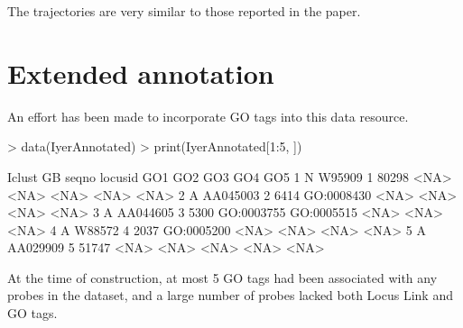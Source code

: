 \documentclass[12pt]{article}
\begin{document}
The trajectories are very similar to those reported in the paper.
\section{Extended annotation}
An effort has been made to incorporate GO tags into this data resource.
\begin{Schunk}
\begin{Sinput}
> data(IyerAnnotated)
> print(IyerAnnotated[1:5, ])
\end{Sinput}
\begin{Soutput}
  Iclust       GB seqno locusid        GO1        GO2  GO3  GO4  GO5
1      N   W95909     1   80298       <NA>       <NA> <NA> <NA> <NA>
2      A AA045003     2    6414 GO:0008430       <NA> <NA> <NA> <NA>
3      A AA044605     3    5300 GO:0003755 GO:0005515 <NA> <NA> <NA>
4      A   W88572     4    2037 GO:0005200       <NA> <NA> <NA> <NA>
5      A AA029909     5   51747       <NA>       <NA> <NA> <NA> <NA>
\end{Soutput}
\end{Schunk}
At the time of construction, at most 5 GO tags had been
associated with any probes in the dataset, and a large number
of probes lacked both Locus Link and GO tags.
\end{document}
